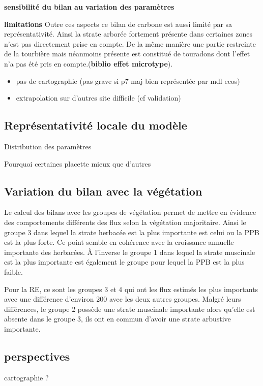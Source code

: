 \textbf{sensibilité du bilan au variation des paramètres}

\textbf{limitations}
Outre ces aspects ce bilan de carbone est aussi limité par sa représentativité. 
Ainsi la strate arborée fortement présente dans certaines zones n'est pas directement prise en compte.
De la même manière une partie restreinte de la tourbière mais néanmoins présente est constitué de touradons dont l'effet n'a pas été pris en compte.\plop (\textbf{biblio effet microtype}).


\begin{itemize}
\item pas de cartographie (pas grave si p7 maj bien représentée par mdl ecos)
\item extrapolation sur d'autres site difficile (cf validation)
\end{itemize}

\subsection{Représentativité locale du modèle}

Distribution des paramètres

Pourquoi certaines placette mieux que d'autres

\subsection{Variation du bilan avec la végétation}
Le calcul des bilans avec les groupes de végétation permet de mettre en évidence des comportements différents des flux selon la végétation majoritaire.
Ainsi le groupe 3 dans lequel la strate herbacée est la plus importante est celui ou la PPB est la plus forte.
Ce point semble en cohérence avec la croissance annuelle importante des herbacées.
À l'inverse le groupe 1 dans lequel la strate muscinale est la plus importante est également le groupe pour lequel la PPB est la plus faible.
\plop

Pour la RE, ce sont les groupes 3 et 4 qui ont les flux estimés les plus importants avec une différence d'environ \SI{200}{\gcma} avec les deux autres groupes.
Malgré leurs différences, le groupe 2 possède une strate muscinale importante alors qu'elle est absente dans le groupe 3, ils ont en commun d'avoir une strate arbustive importante.


\subsection{perspectives}

cartographie ?

